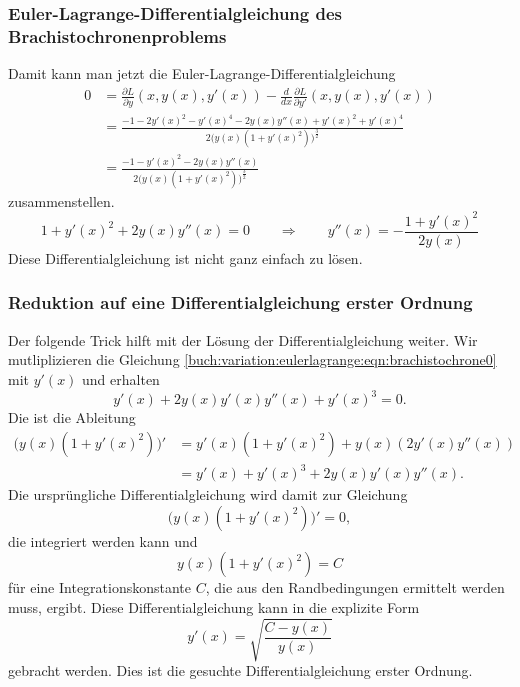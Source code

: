 \subsubsection{Euler-Lagrange-Differentialgleichung des
Brachistochronenproblems}
Damit kann man jetzt die Euler-Lagrange-Differentialgleichung
\begin{align*}
0
&=
\frac{\partial L}{\partial y}(x,y(x),y'(x))
-
\frac{d}{dx}
\frac{\partial L}{\partial y'}(x,y(x),y'(x))
\\
&=
\frac{
-1 - 2y'(x)^2 - y'(x)^4
-2y(x)y''(x)+y'(x)^2+y'(x)^4
}{
2
\bigl(
y(x)
(1+y'(x)^2)
\bigr)^{\frac32}
}
\\
&=
\frac{
-1 - y'(x)^2
-2y(x)y''(x)
}{
2
\bigl(
y(x)
(1+y'(x)^2)
\bigr)^{\frac32}
}
\end{align*}
zusammenstellen.
\begin{equation}
1+y'(x)^2+2y(x)y''(x)=0
\qquad\Rightarrow\qquad
y''(x)
=
-\frac{1+y'(x)^2}{2y(x)}
\label{buch:variation:eulerlagrange:eqn:brachistochrone0}
\end{equation}
Diese Differentialgleichung ist nicht ganz einfach zu lösen.

%
%
\subsubsection{Reduktion auf eine Differentialgleichung erster Ordnung}
Der folgende Trick hilft mit der Lösung der Differentialgleichung weiter.
Wir mutliplizieren die Gleichung
\eqref{buch:variation:eulerlagrange:eqn:brachistochrone0}
mit $y'(x)$ und erhalten
\[
y'(x) + 2y(x)y'(x)y''(x) + y'(x)^3 = 0.
\]
Die ist die Ableitung
\begin{align*}
\bigl(
y(x)(1+y'(x)^2)
\bigr)'
&=
y'(x)(1+y'(x)^2)
+
y(x)(2y'(x)y''(x))
\\
&=
y'(x) + y'(x)^3
+2y(x)y'(x)y''(x).
\end{align*}
Die ursprüngliche Differentialgleichung wird damit zur Gleichung
\[
\bigl(
y(x)(1+y'(x)^2)
\bigr)'
=
0,
\]
die integriert werden kann und
\[
y(x)(1+y'(x)^2)
=
C
\]
für eine Integrationskonstante $C$, die aus den Randbedingungen
ermittelt werden muss, ergibt.
Diese Differentialgleichung kann in die explizite Form
\begin{equation}
y'(x)
=
\sqrt{
\frac{C-y(x)}{y(x)}
}
\label{buch:variation:eulerlagrange:eqn:brachistochrone1}
\end{equation}
gebracht werden.
Dies ist die gesuchte Differentialgleichung erster Ordnung.

